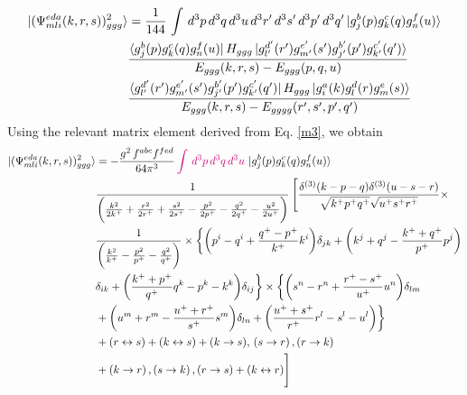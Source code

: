 \documentclass[a4paper,11pt]{article}
\begin{document}
\begin{figure}[htbp]
    \centering
\end{figure}
\begin{align}
    \ket{(\Psi^{eda}_{mli}(k,r,s))^{2}_{ggg}} & =  \frac{1}{144}\, \int\, d^{3}p\, d^{3}q\, d^{3}u\, d^{3}r^{\prime}\, d^{3}s^{\prime}\, d^{3}p^{\prime}\,d^{3}q^{\prime}\ket{g^{b}_{j}(p)g^{c}_{k}(q)g^{f}_{n}(u)} \notag \\ &  \frac{\bra{g^{b}_{j}(p)g^{c}_{k}(q)g^{f}_{n}(u)}H_{ggg}\ket{g^{d^{\prime}}_{l^{\prime}}(r^{\prime})g^{e^{\prime}}_{m^{\prime}}(s^{\prime})g^{b^{\prime}}_{j^{\prime}}(p^{\prime})g^{c^{\prime}}_{k^{\prime}}(q^{\prime})}}{E_{ggg}(k,r,s)-E_{ggg}(p,q,u)}\notag \\ & \frac{\bra{g^{d^{\prime}}_{l^{\prime}}(r^{\prime})g^{e^{\prime}}_{m^{\prime}}(s^{\prime})g^{b^{\prime}}_{j^{\prime}}(p^{\prime})g^{c^{\prime}}_{k^{\prime}}(q^{\prime})}H_{ggg}\ket{g^{a}_{i}(k)g^{d}_{l}(r)g^{e}_{m}(s)}}{E_{ggg}(k,r,s)-E_{gggg}(r^{\prime},s^{\prime},p^{\prime},q^{\prime})}
\end{align}
Using the relevant matrix element derived from Eq. \eqref{m3}, we obtain
\begin{align}
    \ket{(\Psi^{eda}_{mli}(k,r,s))^{2}_{ggg}} & = - \frac{g^{2}\,f^{abc}f^{fed}}{64\pi^{3}}\,{\color{chg}\int\, d^{3}p\, d^{3}q\, d^{3}u}\,\ket{g^{b}_{j}(p)g^{c}_{k}(q)g^{f}_{n}(u)}\notag \\ & \frac{1}{\bigg(\frac{k^{2}}{2k^{+}}+\frac{r^{2}}{2r^{+}}+\frac{s^{2}}{2s^{+}}-\frac{p^{2}}{2p^{+}}-\frac{q^{2}}{2q^{+}}-\frac{u^{2}}{2u^{+}}\bigg)}\, \Bigg[\frac{\delta^{(3)}(k-p-q)\delta^{(3)}(u-s-r)}{\sqrt{k^{+}p^{+}q^{+}}\sqrt{u^{+}s^{+}r^{+}}} \times\notag \\ &  \frac{1}{\bigg(\frac{k^{2}}{k^{+}}-\frac{p^{2}}{p^{+}}-\frac{q^{2}}{q^{+}}\bigg)}\times\bigg\{\bigg(p^{i}-q^{i} +\frac{q^{+}-p^{+}}{k^{+}}k^{i}\bigg)\delta_{jk} +\bigg(k^{j}+q^{j}-\frac{k^{+}+q^{+}}{p^{+}}p^{j}\bigg)\notag \\ & \delta_{ik} +\bigg(\frac{k^{+}+p^{+}}{q^{+}}q^{k}-p^{k}-k^{k}\bigg)\delta_{ij}\bigg\} \times \bigg\{\bigg(s^{n}-r^{n}+\frac{r^{+}-s^{+}}{u^{+}}u^{n}\bigg)\delta_{lm}\notag \\ & +\bigg(u^{m}+r^{m}-\frac{u^{+}+r^{+}}{s^{+}}s^{m}\bigg)\delta_{ln}+\bigg(\frac{u^{+}+s^{+}}{r^{+}}r^{l}-s^{l}-u^{l}\bigg)\bigg\}\notag \\ &  + (r\leftrightarrow s) + (k\leftrightarrow s)  + (k\rightarrow s),\,(s\rightarrow r)\,, (r\rightarrow k)  \notag \\ & + (k \rightarrow r)\, , (s\rightarrow k)\,, (r\rightarrow s)+(k\leftrightarrow r) \Bigg]
\end{align}
    
\end{document}
